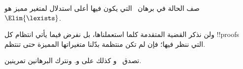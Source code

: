 \documentclass[../../../include/open-logic-section]{subfiles}
\begin{document}
\begin{prob}
صف الحالة في برهان~ التي يكون فيها أعلى استدلال
لمتغير مميز هو~$\Elim{\lexists}$.
\end{prob}

ولن نذكر القضية المتقدمة كلما استعملناها، بل نفرض فيما يأتي انتظام كل
!!{proof}s التي ننظر فيها؛ فإن لم تكن منتظمة بدّلنا متغيراتها المميزة
حتى تنتظم.

تصدق~ و كذلك على
 و. ونترك البرهانين تمرينين.
\end{document}
